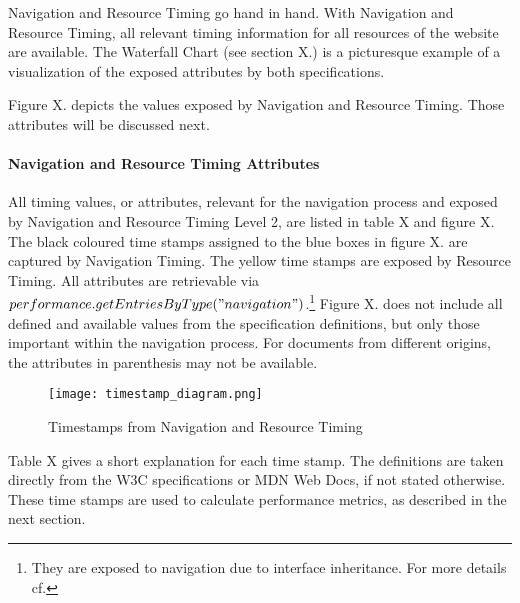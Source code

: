 Navigation and Resource Timing go hand in hand.
With Navigation and Resource Timing, all relevant timing information for all resources of the website are available.
The Waterfall Chart (see section X.) is a picturesque example of a visualization of the exposed attributes by both specifications.

Figure X. depicts the values exposed by Navigation and Resource Timing.
Those attributes will be discussed next.







\paragraph{Navigation and Resource Timing Attributes}

All timing values, or attributes, relevant for the navigation process and exposed by Navigation and Resource Timing Level 2, are listed in table X and figure X.
The black coloured time stamps assigned to the blue boxes in figure X. are captured by Navigation Timing.
The yellow time stamps are exposed by Resource Timing.
All attributes are retrievable via $performance.getEntriesByType("navigation")$.\footnote{They are exposed to navigation due to interface inheritance. For more details cf. } %
Figure X. does not include all defined and available values from the specification definitions, but only those important within the navigation process.
For documents from different origins, the attributes in parenthesis may not be available.%

\begin{figure}[h!]
\begin{center}
\texttt{[image: timestamp\_diagram.png]}
\caption{Timestamps from Navigation and Resource Timing}
\label{img:latency}
\end{center}
\end{figure}


Table X gives a short explanation for each time stamp.
The definitions are taken directly from the W3C specifications or MDN Web Docs, if not stated otherwise.
These time stamps are used to calculate performance metrics, as described in the next section.



